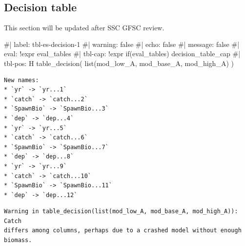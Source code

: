 \documentclass[
]{scrartcl}
\newenvironment{Shaded}{\begin{snugshade}}{\end{snugshade}}
\newcommand{\CommentTok}[1]{\textcolor[rgb]{0.37,0.37,0.37}{#1}}
\newcommand{\FunctionTok}[1]{\textcolor[rgb]{0.28,0.35,0.67}{#1}}
\newcommand{\NormalTok}[1]{\textcolor[rgb]{0.00,0.23,0.31}{#1}}
\begin{document}
\clearpage

\subsection*{Decision table}\label{decision-table}

This section will be updated after SSC GFSC review.

\begin{Shaded}
\begin{Highlighting}[]
 \CommentTok{\#| label: tbl{-}es{-}decision{-}1}
 \CommentTok{\#| warning: false}
 \CommentTok{\#| echo: false}
 \CommentTok{\#| message: false}
 \CommentTok{\#| eval: !expr eval\_tables }
 \CommentTok{\#| tbl{-}cap: !expr if(eval\_tables) decision\_table\_cap }
 \CommentTok{\#| tbl{-}pos: H}
 \FunctionTok{table\_decision}\NormalTok{(}
   \FunctionTok{list}\NormalTok{(mod\_low\_A, mod\_base\_A, mod\_high\_A)}
\NormalTok{ )}
\end{Highlighting}
\end{Shaded}

\begin{verbatim}
New names:
* `yr` -> `yr...1`
* `catch` -> `catch...2`
* `SpawnBio` -> `SpawnBio...3`
* `dep` -> `dep...4`
* `yr` -> `yr...5`
* `catch` -> `catch...6`
* `SpawnBio` -> `SpawnBio...7`
* `dep` -> `dep...8`
* `yr` -> `yr...9`
* `catch` -> `catch...10`
* `SpawnBio` -> `SpawnBio...11`
* `dep` -> `dep...12`
\end{verbatim}

\begin{verbatim}
Warning in table_decision(list(mod_low_A, mod_base_A, mod_high_A)): Catch
differs among columns, perhaps due to a crashed model without enough biomass.
\end{verbatim}
\end{document}
